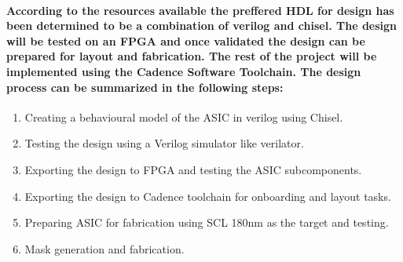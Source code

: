 \documentclass[12pt,a4paper]{report}
\begin{document}
\paragraph{\textrm{\textmd{According to the resources available the preffered HDL for design has been determined to be a combination of verilog and chisel. The design will be tested on an FPGA and once validated the design can be prepared for layout and fabrication. The rest of the project will be implemented using the Cadence Software Toolchain. The design process can be summarized in the following steps:}}}
\begin{enumerate}
	\item Creating a behavioural model of the ASIC in verilog using Chisel.
	\item Testing the design using a Verilog simulator like verilator.
	\item Exporting the design to FPGA and testing the ASIC subcomponents.
	\item Exporting the design to Cadence toolchain for onboarding and layout tasks.
	\item Preparing ASIC for fabrication using SCL 180nm as the target and testing.
	\item Mask generation and fabrication.
\end{enumerate}

\end{document}

